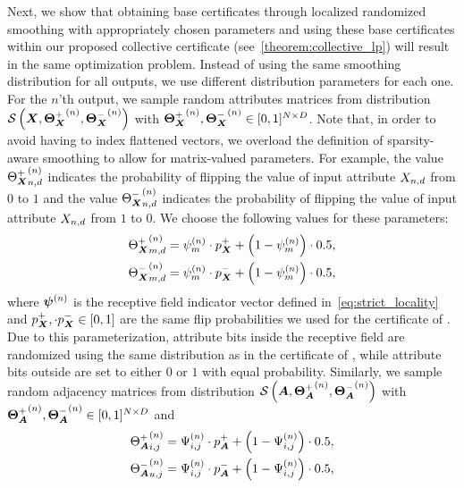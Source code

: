 Next, we show that obtaining base certificates through localized randomized smoothing with appropriately chosen parameters 
and using these base certificates within our proposed collective certificate (see~\autoref{theorem:collective_lp}) will result in the same optimization problem.
Instead of using the same smoothing distribution for all outputs, we use different distribution parameters for each one.
For the $n$'th output, we sample random attributes matrices from distribution
$\mathcal{S}
\left({\bm{X}}, {{\bm{\Theta}}_{\bm{X}}^{+}}^{(n)},  {{\bm{\Theta}}_{\bm{X}}^{-}}^{(n)} \right)$
with  ${{\bm{\Theta}}_{\bm{X}}^{+}}^{(n)}, {{\bm{\Theta}}_{\bm{X}}^{-}}^{(n)} \in [0,1]^{N \times D}$.
Note that, in order to avoid having to index flattened vectors, we overload the definition of sparsity-aware smoothing to allow for matrix-valued parameters.
For example, the value ${{\Theta}_{\bm{X}}^{+}}^{(n)}_{n,d}$ indicates the probability of flipping the value of input attribute ${X}_{n,d}$ from $0$ to $1$ and the value ${{\Theta}_{\bm{X}}^{-}}^{(n)}_{n,d}$ indicates the probability of flipping the value of input attribute ${X}_{n,d}$ from $1$ to $0$.
We choose the following values for these parameters:
\begin{align}
    \label{eq:subsumption_distribution_1}
     & {{\Theta}_{\bm{X}}^{+}}^{(n)}_{m,d} = {\psi}^{(n)}_m \cdot p_{\bm{X}}^{+} + \left(1 - {\psi}^{(n)}_m \right) \cdot 0.5,
     \\
     \label{eq:subsumption_distribution_2}
    & {{\Theta}_{\bm{X}}^{-}}^{(n)}_{m,d} = {\psi}^{(n)}_m \cdot p_{\bm{X}}^{-} + \left(1 - {\psi}^{(n)}_m \right) \cdot 0.5,
\end{align}
where ${\bm{\psi}}^{(n)}$ is the receptive field indicator vector defined in~\autoref{eq:strict_locality}
and $p_{\bm{X}}^{+},\cdot p_{\bm{X}}^{-} \in [0,1]$ are the same flip probabilities we used for the certificate of \citet{Schuchardt2021}.
Due to this parameterization, attribute bits inside the receptive field are randomized using the same distribution as in the certificate of \citet{Schuchardt2021}, while attribute bits outside are set to either $0$ or $1$ with equal probability.
Similarly, we sample random adjacency matrices from distribution 
$\mathcal{S}
\left({\bm{A}}, {{\bm{\Theta}}_{\bm{A}}^{+}}^{(n)},  {{\bm{\Theta}}_{\bm{A}}^{-}}^{(n)} \right)$
with  ${{\bm{\Theta}}_{\bm{A}}^{+}}^{(n)}, {{\bm{\Theta}}_{\bm{A}}^{-}}^{(n)} \in [0,1]^{N \times D}$
and
\begin{align}
\label{eq:subsumption_distribution_3}
     & {{\Theta}_{\bm{A}}^{+}}^{(n)}_{i,j} = {\Psi}^{(n)}_{i,j} \cdot p_{\bm{A}}^{+} + \left(1 - {\Psi}^{(n)}_{i,j} \right) \cdot 0.5,
     \\
     \label{eq:subsumption_distribution_4}
    & {{\Theta}_{\bm{A}}^{-}}^{(n)}_{u,j} = {\Psi}^{(n)}_{i,j} \cdot p_{\bm{A}}^{-} + \left(1 - {\Psi}^{(n)}_{i,j} \right) \cdot 0.5,
\end{align}
